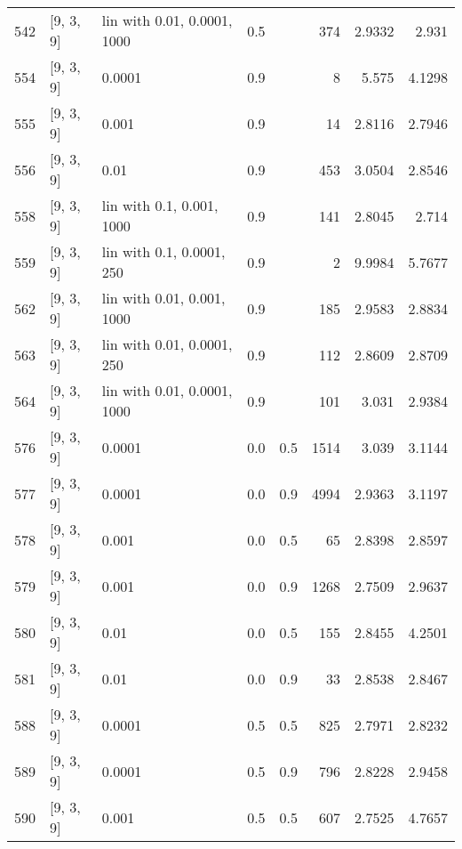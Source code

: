 \begin{longtable}{lllrrrrr}
  542 &          [9, 3, 9] & lin with 0.01, 0.0001, 1000 &      0.5 &     &  374 &   2.9332 &    2.931 \\
  554 &          [9, 3, 9] &                      0.0001 &      0.9 &     &    8 &    5.575 &   4.1298 \\
  555 &          [9, 3, 9] &                       0.001 &      0.9 &     &   14 &   2.8116 &   2.7946 \\
  556 &          [9, 3, 9] &                        0.01 &      0.9 &     &  453 &   3.0504 &   2.8546 \\
  558 &          [9, 3, 9] &   lin with 0.1, 0.001, 1000 &      0.9 &     &  141 &   2.8045 &    2.714 \\
  559 &          [9, 3, 9] &   lin with 0.1, 0.0001, 250 &      0.9 &     &    2 &   9.9984 &   5.7677 \\
  562 &          [9, 3, 9] &  lin with 0.01, 0.001, 1000 &      0.9 &     &  185 &   2.9583 &   2.8834 \\
  563 &          [9, 3, 9] &  lin with 0.01, 0.0001, 250 &      0.9 &     &  112 &   2.8609 &   2.8709 \\
  564 &          [9, 3, 9] & lin with 0.01, 0.0001, 1000 &      0.9 &     &  101 &    3.031 &   2.9384 \\
  576 &          [9, 3, 9] &                      0.0001 &      0.0 & 0.5 & 1514 &    3.039 &   3.1144 \\
  577 &          [9, 3, 9] &                      0.0001 &      0.0 & 0.9 & 4994 &   2.9363 &   3.1197 \\
  578 &          [9, 3, 9] &                       0.001 &      0.0 & 0.5 &   65 &   2.8398 &   2.8597 \\
  579 &          [9, 3, 9] &                       0.001 &      0.0 & 0.9 & 1268 &   2.7509 &   2.9637 \\
  580 &          [9, 3, 9] &                        0.01 &      0.0 & 0.5 &  155 &   2.8455 &   4.2501 \\
  581 &          [9, 3, 9] &                        0.01 &      0.0 & 0.9 &   33 &   2.8538 &   2.8467 \\
  588 &          [9, 3, 9] &                      0.0001 &      0.5 & 0.5 &  825 &   2.7971 &   2.8232 \\
  589 &          [9, 3, 9] &                      0.0001 &      0.5 & 0.9 &  796 &   2.8228 &   2.9458 \\
  590 &          [9, 3, 9] &                       0.001 &      0.5 & 0.5 &  607 &   2.7525 &   4.7657 \\

\end{longtable}
